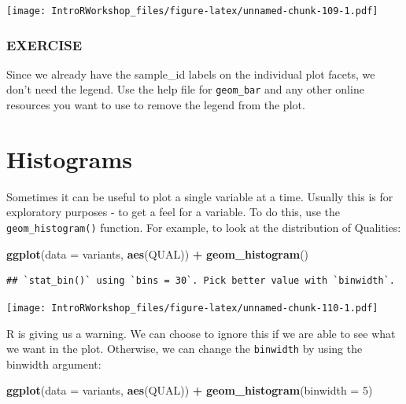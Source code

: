 \documentclass[
]{book}
\newenvironment{Shaded}{\begin{snugshade}}{\end{snugshade}}
\newcommand{\AttributeTok}[1]{\textcolor[rgb]{0.13,0.29,0.53}{#1}}
\newcommand{\DecValTok}[1]{\textcolor[rgb]{0.00,0.00,0.81}{#1}}
\newcommand{\FunctionTok}[1]{\textcolor[rgb]{0.13,0.29,0.53}{\textbf{#1}}}
\newcommand{\NormalTok}[1]{#1}
\newcommand{\SpecialCharTok}[1]{\textcolor[rgb]{0.81,0.36,0.00}{\textbf{#1}}}
\begin{document}
\texttt{[image: IntroRWorkshop\_files/figure-latex/unnamed-chunk-109-1.pdf]}

\subsubsection*{EXERCISE}\label{exercise-5}

Since we already have the sample\_id labels on the individual plot facets, we don't need the legend. Use the help file for \texttt{geom\_bar} and any other online resources you want to use to remove the legend from the plot.

\section{Histograms}\label{histograms}

Sometimes it can be useful to plot a single variable at a time. Usually this is for exploratory purposes - to get a feel for a variable. To do this, use the \texttt{geom\_histogram()} function. For example, to look at the distribution of Qualities:

\begin{Shaded}
\begin{Highlighting}[]
\FunctionTok{ggplot}\NormalTok{(}\AttributeTok{data =}\NormalTok{ variants, }\FunctionTok{aes}\NormalTok{(QUAL)) }\SpecialCharTok{+}
  \FunctionTok{geom\_histogram}\NormalTok{()}
\end{Highlighting}
\end{Shaded}

\begin{verbatim}
## `stat_bin()` using `bins = 30`. Pick better value with `binwidth`.
\end{verbatim}

\texttt{[image: IntroRWorkshop\_files/figure-latex/unnamed-chunk-110-1.pdf]}

R is giving us a warning. We can choose to ignore this if we are able to see what we want in the plot. Otherwise, we can change the \texttt{binwidth} by using the binwidth argument:

\begin{Shaded}
\begin{Highlighting}[]
\FunctionTok{ggplot}\NormalTok{(}\AttributeTok{data =}\NormalTok{ variants, }\FunctionTok{aes}\NormalTok{(QUAL)) }\SpecialCharTok{+}
  \FunctionTok{geom\_histogram}\NormalTok{(}\AttributeTok{binwidth =} \DecValTok{5}\NormalTok{)}
\end{Highlighting}
\end{Shaded}
\end{document}
